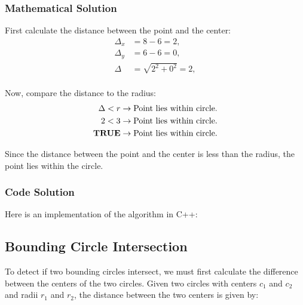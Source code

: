 \subsubsection{Mathematical Solution}

First calculate the distance between the point and the center:
\begin{equation*}
    \begin{aligned}
        \Delta_x & = 8 - 6 = 2,            \\
        \Delta_y & = 6 - 6 = 0,            \\
        \Delta   & = \sqrt{2^2 + 0^2} = 2, \\
    \end{aligned}
\end{equation*}

Now, compare the distance to the radius:
\begin{equation*}
    \begin{aligned}
        \Delta < r                 & \rightarrow \textnormal{Point lies within circle.} \\
        2 < 3                      & \rightarrow \textnormal{Point lies within circle.} \\
        \textnormal{\textbf{TRUE}} & \rightarrow \textnormal{Point lies within circle.} \\
    \end{aligned}
\end{equation*}

Since the distance between the point and the center is less than the radius,
the point lies within the circle.

\subsubsection{Code Solution}

Here is an implementation of the algorithm in C++: \vspace{1em}
\begin{mdframed}[linecolor=black!30!white,linewidth=.5pt,extratopheight=3em]
    
\end{mdframed}

\subsection{Bounding Circle Intersection}

To detect if two bounding circles intersect, we must first calculate the
difference between the centers of the two circles. Given two circles with
centers $c_1$ and $c_2$ and radii $r_1$ and $r_2$, the distance between the two
centers is given by:

